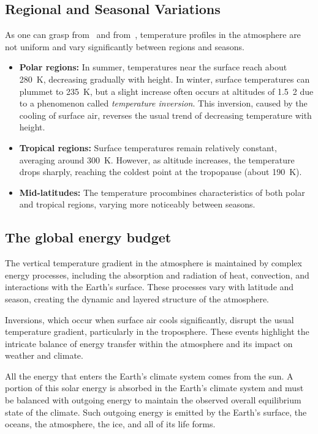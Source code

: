 \subsection{Regional and Seasonal Variations}

As one can grasp from~\fig{\ref{fig:temp-profile-dobson}} and from~\tabref{\ref{tab:atm-temps-layer-latitude}}, temperature profiles in the atmosphere are not uniform and vary significantly between regions and seasons.

\begin{itemize}
	\item \textbf{Polar regions:} In summer, temperatures near the surface reach about 280~K, decreasing gradually with height. In winter, surface temperatures can plummet to 235~K, but a slight increase often occurs at altitudes of \qty{1.5}{2}{\kilo\meter} due to a phenomenon called \emph{temperature inversion}. This inversion, caused by the cooling of surface air, reverses the usual trend of decreasing temperature with height.
	\item \textbf{Tropical regions:} Surface temperatures remain relatively constant, averaging around 300~K. However, as altitude increases, the temperature drops sharply, reaching the coldest point at the tropopause (about 190~K).
	\item \textbf{Mid-latitudes:} The temperature pro\file combines characteristics of both polar and tropical regions, varying more noticeably between seasons.
\end{itemize}


\subsection{The global energy budget}\label{subsec:global-energy-budget}

The vertical temperature gradient in the atmosphere is maintained by complex energy processes, including the absorption and radiation of heat, convection, and interactions with the Earth's surface. These processes vary with latitude and season, creating the dynamic and layered structure of the atmosphere.

Inversions, which occur when surface air cools significantly, disrupt the usual temperature gradient, particularly in the troposphere. These events highlight the intricate balance of energy transfer within the atmosphere and its impact on weather and climate.

All the energy that enters the Earth’s climate system comes from the sun.
A portion of this solar energy is absorbed in the Earth's climate system and must be balanced with
outgoing energy to maintain the observed overall equilibrium state of the climate.
Such outgoing energy is emitted by the Earth's surface, the oceans, the atmosphere, the ice, and all of its life forms.

